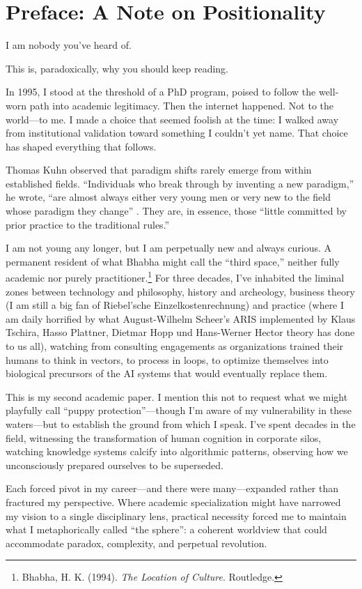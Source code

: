 \section*{Preface: A Note on Positionality}

I am nobody you've heard of.

This is, paradoxically, why you should keep reading.

In 1995, I stood at the threshold of a PhD program, poised to follow the well-worn path into academic legitimacy. Then the internet happened. Not to the world---to me. I made a choice that seemed foolish at the time: I walked away from institutional validation toward something I couldn't yet name. That choice has shaped everything that follows.

Thomas Kuhn observed that paradigm shifts rarely emerge from within established fields. ``Individuals who break through by inventing a new paradigm,'' he wrote, ``are almost always either very young men or very new to the field whose paradigm they change'' \citep{kuhn1962}. They are, in essence, those ``little committed by prior practice to the traditional rules.''

I am not young any longer, but I am perpetually new and always curious. A permanent resident of what Bhabha might call the ``third space,'' neither fully academic nor purely practitioner.\footnote{Bhabha, H. K. (1994). \emph{The Location of Culture}. Routledge.} For three decades, I've inhabited the liminal zones between technology and philosophy, history and archeology, business theory (I am still a big fan of Riebel'sche Einzelkostenrechnung) and practice (where I am daily horrified by what August-Wilhelm Scheer's ARIS implemented by Klaus Tschira, Hasso Plattner, Dietmar Hopp und Hans-Werner Hector theory has done to us all), watching from consulting engagements as organizations trained their humans to think in vectors, to process in loops, to optimize themselves into biological precursors of the AI systems that would eventually replace them.

This is my second academic paper. I mention this not to request what we might playfully call ``puppy protection''---though I'm aware of my vulnerability in these waters---but to establish the ground from which I speak. I've spent decades in the field, witnessing the transformation of human cognition in corporate silos, watching knowledge systems calcify into algorithmic patterns, observing how we unconsciously prepared ourselves to be superseded.

Each forced pivot in my career---and there were many---expanded rather than fractured my perspective. Where academic specialization might have narrowed my vision to a single disciplinary lens, practical necessity forced me to maintain what I metaphorically called ``the sphere'': a coherent worldview that could accommodate paradox, complexity, and perpetual revolution.


